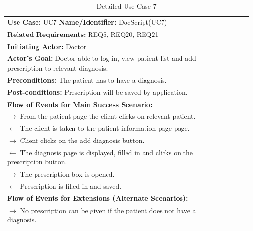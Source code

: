 \documentclass[a4paper]{article}
\begin{document}
\FloatBarrier

\begin{table}[h!]
\centering
\caption*{Detailed Use Case 7}
\label{DetailedUC2}
\begin{tabular}{|c|llll}
\cline{1-1}

\multicolumn{1}{|l|}{\textbf{Use Case:} UC7 \textbf{Name/Identifier:} DocScript(UC7)} &  &  &  &  \\ \cline{1-1}

\multicolumn{1}{|l|}{\textbf{Related Requirements:} REQ5, REQ20, REQ21} &  &  &  &  \\

\multicolumn{1}{|l|}{\textbf{Initiating Actor:} Doctor} &  &  &  &  \\

\multicolumn{1}{|l|}{\textbf{Actor’s Goal:} Doctor able to log-in, view patient list and add prescription to relevant diagnosis.} &  &  &  &  \\

\multicolumn{1}{|l|}{\textbf{Preconditions:} The patient has to have a diagnosis.} &  &  &  &  \\

\multicolumn{1}{|l|}{\textbf{Post-conditions:} Prescription will be saved by application.} &  &  &  &  \\

\multicolumn{1}{|l|}{\textbf{Flow of Events for Main Success Scenario:}} &  &  &  &  \\

\multicolumn{1}{|l|}{ $ \rightarrow $ From the patient page the client clicks on relevant patient.} &  &  &  &  \\

\multicolumn{1}{|l|}{ $ \leftarrow $ The client is taken to the patient information page page.} &  &  &  &  \\

\multicolumn{1}{|l|}{ $ \rightarrow $ Client clicks on the add diagnosis button.} &  &  &  &  \\

\multicolumn{1}{|l|}{ $ \leftarrow $ The diagnosis page is displayed, filled in and clicks on the prescription button.} &  &  &  &  \\

\multicolumn{1}{|l|}{ $ \rightarrow $ The prescription box is opened.} &  &  &  &  \\

\multicolumn{1}{|l|}{ $ \leftarrow $ Prescription is filled in and saved.} &  &  &  &  \\

\multicolumn{1}{|l|}{\textbf{Flow of Events for Extensions (Alternate Scenarios):}} &  &  &  &  \\

\multicolumn{1}{|l|}{ $ \rightarrow $ No prescription can be given if the patient does not have a diagnosis.} &  &  &  &  \\ \cline{1-1}

\end{tabular}
\end{table}
\end{document}
